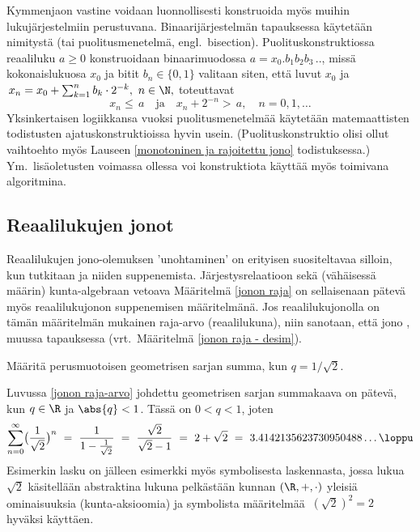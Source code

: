 Kymmenjaon vastine voidaan luonnollisesti konstruoida myös muihin lukujärjestelmiin perustuvana. 
Binaarijärjestelmän tapauksessa käytetään nimitystä  (tai 
puolitusmenetelmä, engl.\ bisection). Puolituskonstruktiossa reaaliluku $a \ge 0$ konstruoidaan
binaarimuodossa $a = x_0.b_1b_2b_3\,..$, missä kokonaislukuosa $x_0$ ja bitit $b_n \in \{0,1\}$
valitaan siten, että luvut $x_0$ ja $\,x_n = x_0 + \sum_{k=1}^n b_k \cdot 2^{-k},\ n \in \N,$
toteuttavat  
\[
x_n \le\,a \quad \text{ja} \quad x_n + 2^{-n} >\,a, \quad n = 0,1, \ldots
\]
Yksinkertaisen logiikkansa vuoksi puolitusmenetelmää käytetään matemaattisten todistusten 
ajatuskonstruktioissa hyvin usein. (Puolituskonstruktio olisi ollut vaihtoehto myös Lauseen
\ref{monotoninen ja rajoitettu jono} todistuksessa.) Ym.\ lisäoletusten voimassa ollessa voi
konstruktiota käyttää myös toimivana algoritmina.

\subsection{Reaalilukujen jonot}

Reaalilukujen jono-olemuksen 'unohtaminen' on erityisen suositeltavaa silloin, kun tutkitaan 
 ja niiden suppenemista. Järjestysrelaatioon sekä (vähäisessä määrin)
kunta-algebraan vetoava Määritelmä \ref{jonon raja} on sellaisenaan pätevä myös reaalilukujonon
suppenemisen määritelmänä. Jos reaalilukujonolla on tämän määritelmän mukainen raja-arvo
(reaalilukuna), niin sanotaan, että jono
, muussa tapauksessa  (vrt.\ Määritelmä \ref{jonon raja - desim}). 
\begin{Exa} \label{reaalinen geometrinen sarja} Määritä perusmuotoisen geometrisen sarjan summa,
kun $q = 1/\sqrt{2}$. 
\end{Exa}
\ratk Luvussa \ref{jonon raja-arvo} johdettu geometrisen sarjan summakaava on pätevä, kun 
$q \in \R$ ja $\abs{q}<1$. Tässä on $0<q<1$, joten
\[
\sum_{n=0}^{\infty} \bigl( \frac{1}{\sqrt{2}} \bigr)^n\ 
                      =\ \frac{1}{1-\frac{1}{\sqrt{2}}}\ =\ \frac{\sqrt{2}}{\sqrt{2}-1}\ 
                      =\ 2 + \sqrt{2}\ =\ 3.4142135623730950488 \ldots  \loppu
\]
Esimerkin lasku on jälleen esimerkki myös symbolisesta laskennasta, jossa lukua $\sqrt{2}$ 
käsitellään abstraktina lukuna pelkästään kunnan $(\R,+,\cdot)$ yleisiä ominaisuuksia 
(kunta-aksioomia) ja symbolista määritelmää $\ (\sqrt{2})^2 = 2\ $ hyväksi käyttäen.

